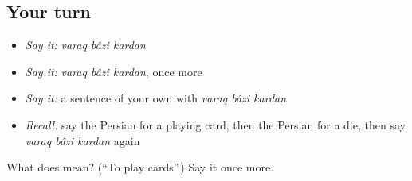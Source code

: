 \subsection*{Your turn}
\begin{itemize}
\raggedright
  \item \emph{Say it:} \emph{varaq bâzi kardan}
  \item \emph{Say it:} \emph{varaq bâzi kardan}, once more
  \item \emph{Say it:} a sentence of your own with \emph{varaq bâzi kardan}
  \item \emph{Recall:} say the Persian for a playing card, then the Persian for a die, then say \emph{varaq bâzi kardan} again
\end{itemize}

\begin{tcolorbox}[breakable,colback=teal!4,colframe=teal!35!black,title={Before you move on}]
What does    mean? (\textquotedblleft{}To play cards\textquotedblright{}.) Say it once more.
\end{tcolorbox}
